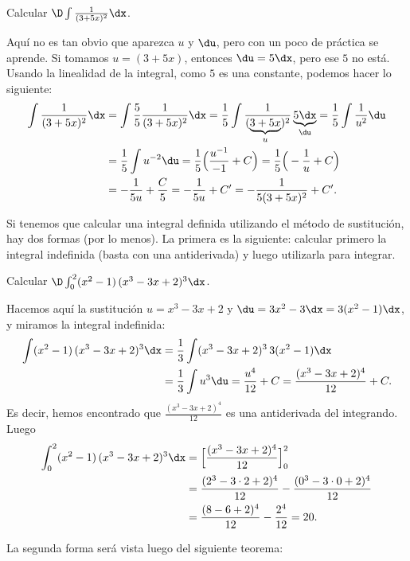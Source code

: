 \begin{example}
  Calcular $\D \int \frac{1}{(3+5x)^2}\dx$. 
  
  Aquí no es tan obvio que aparezca $u$ y $\du$, pero con un poco de práctica se aprende.
  Si tomamos $u=(3+5x)$, entonces $\du = 5\dx$, pero ese $5$ no está. Usando la linealidad de la integral, como $5$ es una constante, podemos hacer lo siguiente:
  \begin{align*}
    \int \frac{1}{(3+5x)^2}\dx &= \int \frac55 \frac{1}{(3+5x)^2}\dx
    = \frac15 \int \frac{1}{(\underbrace{3+5x}_u)^2} \underbrace{5\dx}_{\du}
    = \frac15 \int \frac{1}{u^2} \du 
    \\
    &= \frac15 \int u^{-2} \du
    = \frac15 \Big(\frac{u^{-1}}{-1}+C\Big)
    = \frac15 \Big(-\frac{1}{u}+C\Big)
    \\
    &= -\frac{1}{5u}+\frac{C}5
    = -\frac{1}{5u}+C'
    = -\frac{1}{5(3+5x)^2}+C'.
  \end{align*}
\end{example}

Si tenemos que calcular una integral definida utilizando el método de sustitución, hay dos formas (por lo menos).
La primera es la siguiente: calcular primero la integral indefinida (basta con una antiderivada) y luego utilizarla para integrar.

\begin{example}
  Calcular $\D \int_0^2 (x^2-1) \, (x^3-3x+2)^3 \dx$.

  Hacemos aquí la sustitución $u=x^3-3x+2$ y $\du = 3x^2-3\dx=3(x^2-1)\dx$,
  y miramos la integral indefinida:
  \begin{align*}
    \int (x^2-1) \, (x^3-3x+2)^3 \dx &= \frac13 \int  (x^3-3x+2)^3\, 3(x^2-1) \dx
    \\
    &=\frac13\int u^3 \du = \frac{u^4}{12} + C = \frac{(x^3-3x+2)^4}{12} + C.
  \end{align*}
  Es decir, hemos encontrado que $\frac{(x^3-3x+2)^4}{12}$ es una antiderivada del integrando.
  Luego
  \begin{align*}
    \int_0^2 (x^2-1) \, (x^3-3x+2)^3 \dx 
    &= \Big[
      \frac{(x^3-3x+2)^4}{12}
      \Big]_0^2
      \\
      &= \frac{(2^3-3\cdot 2+2)^4}{12} - \frac{(0^3-3\cdot 0+2)^4}{12}
      \\
      &=   \frac{(8-6+2)^4}{12} - \frac{2^4}{12} = 20.
  \end{align*}  
\end{example}

La segunda forma será vista luego del siguiente teorema:

